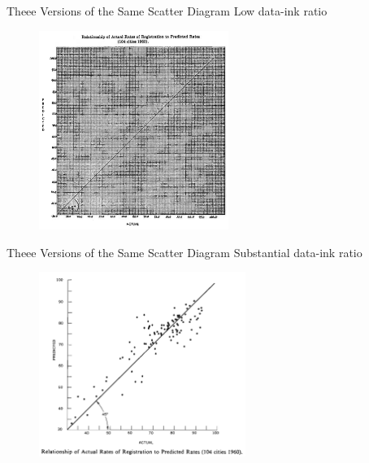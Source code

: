 \documentclass[notes, aspectratio=1610]{beamer}
\begin{document}
\begin{frame}{Theee Versions of the Same Scatter Diagram}
	{Low data-ink ratio}
	\begin{figure}
		\begin{center}
			\includegraphics[width=0.55\textwidth]{images/low.png}
		\end{center}
	\end{figure}
\end{frame}

\begin{frame}{Theee Versions of the Same Scatter Diagram}
	{Substantial data-ink ratio}
	\begin{figure}
		\begin{center}
			\includegraphics[width=0.6\textwidth]{images/high.png}
		\end{center}
	\end{figure}
\end{frame}
\end{document}
